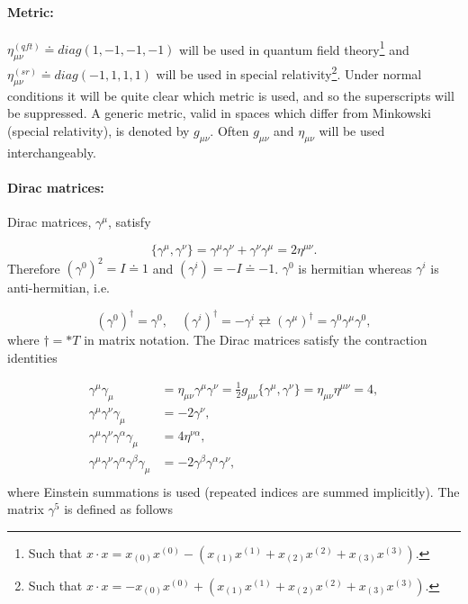 \paragraph{Metric:}$\eta^{(qft)}_{\mu\nu} \doteq diag(1,-1,-1,-1)$ will be used in quantum field theory\footnote{Such that $x\cdot x=x_{(0)}x^{(0)}-(x_{(1)}x^{(1)}+x_{(2)}x^{(2)}+x_{(3)}x^{(3)})$.} and $\eta^{(sr)}_{\mu\nu}\doteq diag(-1,1,1,1)$ will be used in special relativity\footnote{Such that $x\cdot x=-x_{(0)}x^{(0)}+(x_{(1)}x^{(1)}+x_{(2)}x^{(2)}+x_{(3)}x^{(3)})$.}. Under normal conditions it will be quite clear which metric is used, and so the superscripts will be suppressed. A generic metric, valid in spaces which differ from Minkowski (special relativity), is denoted by $g_{\mu\nu}$. Often $g_{\mu\nu}$ and $\eta_{\mu\nu}$ will be used interchangeably.

\paragraph{Dirac matrices:} 
Dirac matrices, $\gamma^\mu$, satisfy

\begin{equation}
	\{\gamma^\mu,\gamma^\nu\}=\gamma^\mu\gamma^\nu+\gamma^\nu\gamma^\mu=2\eta^{\mu\nu}.
\end{equation} 
Therefore $(\gamma^{0})^2=I\doteq1$ and $(\gamma^i)=-I\doteq -1$. $\gamma^0$ is hermitian whereas $\gamma^i$ is anti-hermitian, i.e.

\begin{equation}
	(\gamma^0)^\dagger=\gamma^0, \quad (\gamma^i)^\dagger=-\gamma^i \rightleftarrows (\gamma^\mu)^\dagger=\gamma^0\gamma^\mu\gamma^0,
\end{equation} 
where $\dagger=*T$ in matrix notation. The Dirac matrices satisfy the contraction identities

\begin{equation}
	\begin{split}
		\gamma^\mu\gamma_\mu&=\eta_{\mu\nu}\gamma^\mu\gamma^\nu=\frac{1}{2}g_{\mu\nu}\{\gamma^\mu,\gamma^\nu\}=\eta_{\mu\nu}\eta^{\mu\nu}=4,\\
		\gamma^\mu\gamma^\nu\gamma_\mu&=-2\gamma^\nu,\\
		\gamma^\mu\gamma^\nu\gamma^\alpha\gamma_\mu&=4\eta^{\nu\alpha},\\
		\gamma^\mu\gamma^\nu\gamma^\alpha\gamma^\beta\gamma_\mu&=-2\gamma^\beta\gamma^\alpha\gamma^\nu,\\
	\end{split}
\end{equation} 
where Einstein summations is used (repeated indices are summed implicitly). The matrix $\gamma^5$ is defined as follows

